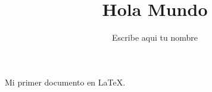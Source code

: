 \documentclass{article}
\title{Hola Mundo}
\author{Escribe aqui tu nombre}
\begin{document}

\maketitle

Mi primer documento en \LaTeX{}.
\end{document}
